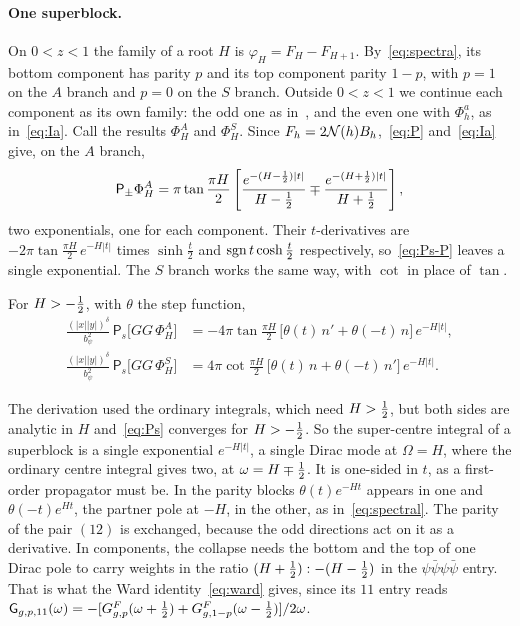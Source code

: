 \paragraph{One superblock.} On $0<z<1$ the family of a root $H$ is $\varphi_H=F_H-F_{H+1}$. By~\eqref{eq:spectra}, its bottom component has parity $p$ and its top component parity $1-p$, with $p=1$ on the $A$ branch and $p=0$ on the $S$ branch. Outside $0<z<1$ we continue each component as its own family: the odd one as in~\cite[(C.4)]{Thong:2026}, and the even one with $\Phi^a_h$, as in~\eqref{eq:Ia}. Call the results $\Phi^A_H$ and $\Phi^S_H$. Since $F_h=2\mathcal{N}(h)B_h$,~\eqref{eq:P} and~\eqref{eq:Ia} give, on the $A$ branch,
\begin{equation}
\mathsf P_\pm\Phi^A_H=\pi\tan\frac{\pi H}2\left[\frac{e^{-(H-\frac12)|t|}}{H-\tfrac12}\mp\frac{e^{-(H+\frac12)|t|}}{H+\tfrac12}\right],
\end{equation}
two exponentials, one for each component. Their $t$-derivatives are $-2\pi\tan\frac{\pi H}2\,e^{-H|t|}$ times $\sinh\frac t2$ and $\operatorname{sgn} t\cosh\frac t2$ respectively, so~\eqref{eq:Ps-P} leaves a single exponential. The $S$ branch works the same way, with $\cot$ in place of $\tan$.

\begin{proposition}\label{prop:supercentre}
For $H>-\tfrac12$, with $\theta$ the step function,
\begin{equation}\label{eq:Ps-family}
\begin{aligned}
\frac{(|x||y|)^\delta}{b_\psi^2}\,\mathsf P_s\big[GG\,\Phi^A_H\big]&=-4\pi\tan\frac{\pi H}2\,\big[\theta(t)\,n'+\theta(-t)\,n\big]\,e^{-H|t|},\\
\frac{(|x||y|)^\delta}{b_\psi^2}\,\mathsf P_s\big[GG\,\Phi^S_H\big]&=4\pi\cot\frac{\pi H}2\,\big[\theta(t)\,n+\theta(-t)\,n'\big]\,e^{-H|t|}.
\end{aligned}
\end{equation}
\end{proposition}

The derivation used the ordinary integrals, which need $H>\tfrac12$, but both sides are analytic in $H$ and~\eqref{eq:Ps} converges for $H>-\tfrac12$. So the super-centre integral of a superblock is a single exponential $e^{-H|t|}$, a single Dirac mode at $\Omega=H$, where the ordinary centre integral gives two, at $\omega=H\mp\tfrac12$. It is one-sided in $t$, as a first-order propagator must be. In the parity blocks $\theta(t)e^{-Ht}$ appears in one and $\theta(-t)e^{Ht}$, the partner pole at $-H$, in the other, as in~\eqref{eq:spectral}. The parity of the pair $(12)$ is exchanged, because the odd directions act on it as a derivative. In components, the collapse needs the bottom and the top of one Dirac pole to carry weights in the ratio $(H+\tfrac12):-(H-\tfrac12)$ in the $\psi\bar\psi\psi\bar\psi$ entry. That is what the Ward identity~\eqref{eq:ward} gives, since its $11$ entry reads $\mathsf{G}_{g,p,11}(\omega)=-[G^F_{g,p}(\omega+\tfrac12)+G^F_{g,1-p}(\omega-\tfrac12)]/2\omega$.

